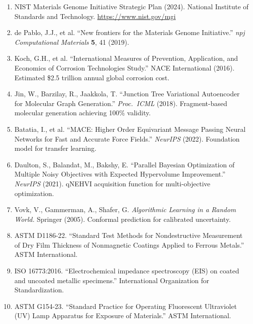 \documentclass[11pt,letterpaper]{article}
\begin{document}
\begin{enumerate}[leftmargin=*]
  \item NIST Materials Genome Initiative Strategic Plan (2024). National Institute of Standards and Technology. \url{https://www.nist.gov/mgi}

  \item de Pablo, J.J., et al. ``New frontiers for the Materials Genome Initiative.'' \textit{npj Computational Materials} \textbf{5}, 41 (2019).

  \item Koch, G.H., et al. ``International Measures of Prevention, Application, and Economics of Corrosion Technologies Study.'' NACE International (2016). Estimated \$2.5 trillion annual global corrosion cost.

  \item Jin, W., Barzilay, R., Jaakkola, T. ``Junction Tree Variational Autoencoder for Molecular Graph Generation.'' \textit{Proc.\ ICML} (2018). Fragment-based molecular generation achieving 100\% validity.

  \item Batatia, I., et al. ``MACE: Higher Order Equivariant Message Passing Neural Networks for Fast and Accurate Force Fields.'' \textit{NeurIPS} (2022). Foundation model for transfer learning.

  \item Daulton, S., Balandat, M., Bakshy, E. ``Parallel Bayesian Optimization of Multiple Noisy Objectives with Expected Hypervolume Improvement.'' \textit{NeurIPS} (2021). qNEHVI acquisition function for multi-objective optimization.

  \item Vovk, V., Gammerman, A., Shafer, G. \textit{Algorithmic Learning in a Random World.} Springer (2005). Conformal prediction for calibrated uncertainty.

  \item ASTM D1186-22. ``Standard Test Methods for Nondestructive Measurement of Dry Film Thickness of Nonmagnetic Coatings Applied to Ferrous Metals.'' ASTM International.

  \item ISO 16773:2016. ``Electrochemical impedance spectroscopy (EIS) on coated and uncoated metallic specimens.'' International Organization for Standardization.

  \item ASTM G154-23. ``Standard Practice for Operating Fluorescent Ultraviolet (UV) Lamp Apparatus for Exposure of Materials.'' ASTM International.


\end{enumerate}
\end{document}
